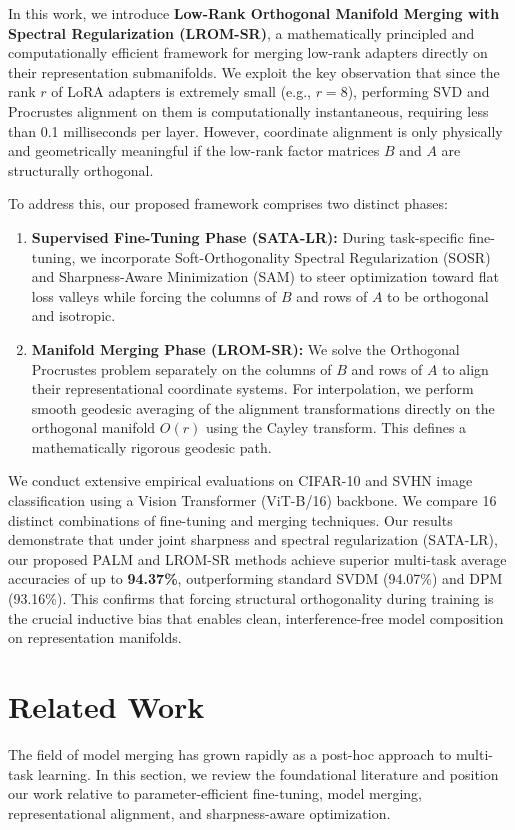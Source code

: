 \documentclass{article}
\theoremstyle{plain}
\theoremstyle{definition}
\theoremstyle{remark}
\begin{document}
In this work, we introduce \textbf{Low-Rank Orthogonal Manifold Merging with Spectral Regularization (LROM-SR)}, a mathematically principled and computationally efficient framework for merging low-rank adapters directly on their representation submanifolds. We exploit the key observation that since the rank $r$ of LoRA adapters is extremely small (e.g., $r = 8$), performing SVD and Procrustes alignment on them is computationally instantaneous, requiring less than 0.1 milliseconds per layer. However, coordinate alignment is only physically and geometrically meaningful if the low-rank factor matrices $B$ and $A$ are structurally orthogonal. 

To address this, our proposed framework comprises two distinct phases:
\begin{enumerate}
    \item \textbf{Supervised Fine-Tuning Phase (SATA-LR):} During task-specific fine-tuning, we incorporate Soft-Orthogonality Spectral Regularization (SOSR) \cite{sata-lr} and Sharpness-Aware Minimization (SAM) \cite{foret2020sharpness} to steer optimization toward flat loss valleys while forcing the columns of $B$ and rows of $A$ to be orthogonal and isotropic.
    \item \textbf{Manifold Merging Phase (LROM-SR):} We solve the Orthogonal Procrustes problem separately on the columns of $B$ and rows of $A$ to align their representational coordinate systems. For interpolation, we perform smooth geodesic averaging of the alignment transformations directly on the orthogonal manifold $O(r)$ using the Cayley transform. This defines a mathematically rigorous geodesic path.
\end{enumerate}

We conduct extensive empirical evaluations on CIFAR-10 and SVHN image classification using a Vision Transformer (ViT-B/16) backbone. We compare 16 distinct combinations of fine-tuning and merging techniques. Our results demonstrate that under joint sharpness and spectral regularization (SATA-LR), our proposed PALM and LROM-SR methods achieve superior multi-task average accuracies of up to \textbf{94.37\%}, outperforming standard SVDM (94.07\%) and DPM (93.16\%). This confirms that forcing structural orthogonality during training is the crucial inductive bias that enables clean, interference-free model composition on representation manifolds.
\section{Related Work}
\label{sec:related}
The field of model merging has grown rapidly as a post-hoc approach to multi-task learning. In this section, we review the foundational literature and position our work relative to parameter-efficient fine-tuning, model merging, representational alignment, and sharpness-aware optimization.
\end{document}
